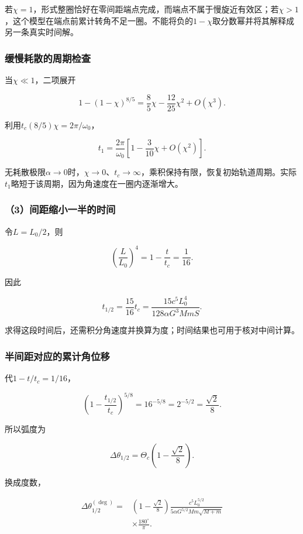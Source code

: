 \documentclass[12pt,a4paper,fontset=fandol]{ctexart}
\begin{document}
若\(\chi=1\)，形式整圈恰好在零间距端点完成，而端点不属于慢旋近有效区；若\(\chi>1\)，这个模型在端点前累计转角不足一圈。不能将负的\(1-\chi\)取分数幂并将其解释成另一条真实时间解。

\subsubsection{缓慢耗散的周期检查}\label{ux7f13ux6162ux8017ux6563ux7684ux5468ux671fux68c0ux67e5}

当\(\chi\ll1\)，二项展开

\[
1-(1-\chi)^{8/5}
=\frac85\chi-\frac{12}{25}\chi^2+O(\chi^3).
\]

利用\(t_c(8/5)\chi=2\pi/\omega_0\)，

\[
\boxed{
t_1=\frac{2\pi}{\omega_0}
\left[1-\frac3{10}\chi+O(\chi^2)\right]}.
\]

无耗散极限\(\alpha\to0\)时，\(\chi\to0\)、\(t_c\to\infty\)，乘积保持有限，恢复初始轨道周期。实际\(t_1\)略短于该周期，因为角速度在一圈内逐渐增大。

\subsubsection{（3）间距缩小一半的时间}\label{ux95f4ux8dddux7f29ux5c0fux4e00ux534aux7684ux65f6ux95f4}

令\(L=L_0/2\)，则

\[
\left(\frac L{L_0}\right)^4
=1-\frac t{t_c}=\frac1{16}.
\]

因此

\[
\boxed{
t_{1/2}=\frac{15}{16}t_c
=\frac{15c^5L_0^4}
{128\alpha G^3MmS}}.
\]

求得这段时间后，还需积分角速度并换算为度；时间结果也可用于核对中间计算。

\subsubsection{半间距对应的累计角位移}\label{ux534aux95f4ux8dddux5bf9ux5e94ux7684ux7d2fux8ba1ux89d2ux4f4dux79fb}

代\(1-t/t_c=1/16\)，

\[
\left(1-\frac{t_{1/2}}{t_c}\right)^{5/8}
=16^{-5/8}=2^{-5/2}=\frac{\sqrt2}{8}.
\]

所以弧度为

\[
\boxed{
\Delta\theta_{1/2}
=\Theta_c\left(1-\frac{\sqrt2}{8}\right)}.
\]

换成度数，

\[
\boxed{
\begin{aligned}
\Delta\theta_{1/2}^{(\deg)}
={}&\left(1-\frac{\sqrt2}{8}\right)
\frac{c^5L_0^{5/2}}
{5\alpha G^{5/2}Mm\sqrt{M+m}}\\
&\times\frac{180^\circ}{\pi}.
\end{aligned}}
\]
\end{document}
